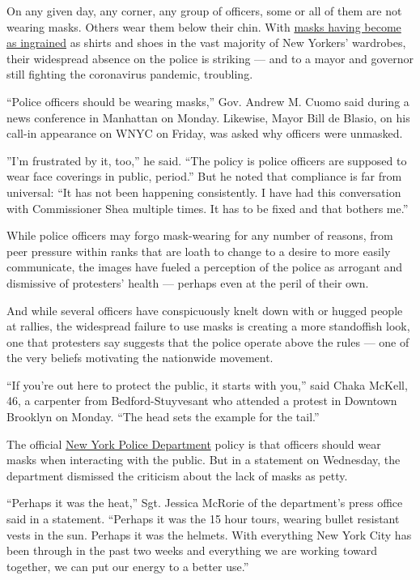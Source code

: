 On any given day, any corner, any group of officers, some or all of them
are not wearing masks. Others wear them below their chin. With
\href{https://www.nytimes3xbfgragh.onion/2020/04/17/nyregion/new-york-coronavirus-masks.html}{masks
having become as ingrained} as shirts and shoes in the vast majority of
New Yorkers' wardrobes, their widespread absence on the police is
striking --- and to a mayor and governor still fighting the coronavirus
pandemic, troubling.

``Police officers should be wearing masks,'' Gov. Andrew M. Cuomo said
during a news conference in Manhattan on Monday. Likewise, Mayor Bill de
Blasio, on his call-in appearance on WNYC on Friday, was asked why
officers were unmasked.

''I'm frustrated by it, too,'' he said. ``The policy is police officers
are supposed to wear face coverings in public, period.'' But he noted
that compliance is far from universal: ``It has not been happening
consistently. I have had this conversation with Commissioner Shea
multiple times. It has to be fixed and that bothers me.''

While police officers may forgo mask-wearing for any number of reasons,
from peer pressure within ranks that are loath to change to a desire to
more easily communicate, the images have fueled a perception of the
police as arrogant and dismissive of protesters' health --- perhaps even
at the peril of their own.

And while several officers have conspicuously knelt down with or hugged
people at rallies, the widespread failure to use masks is creating a
more standoffish look, one that protesters say suggests that the police
operate above the rules --- one of the very beliefs motivating the
nationwide movement.

``If you're out here to protect the public, it starts with you,'' said
Chaka McKell, 46, a carpenter from Bedford-Stuyvesant who attended a
protest in Downtown Brooklyn on Monday. ``The head sets the example for
the tail.''

The official
\href{https://www.nytimes3xbfgragh.onion/2020/06/15/nyregion/nypd-plainclothes-cops.html}{New
York Police Department} policy is that officers should wear masks when
interacting with the public. But in a statement on Wednesday, the
department dismissed the criticism about the lack of masks as petty.

``Perhaps it was the heat,'' Sgt. Jessica McRorie of the department's
press office said in a statement. ``Perhaps it was the 15 hour tours,
wearing bullet resistant vests in the sun. Perhaps it was the helmets.
With everything New York City has been through in the past two weeks and
everything we are working toward together, we can put our energy to a
better use.''

